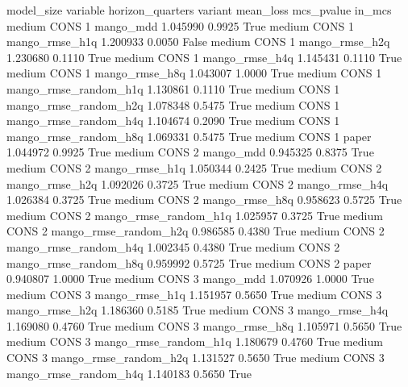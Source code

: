 model_size variable  horizon_quarters               variant  mean_loss  mcs_pvalue  in_mcs
    medium     CONS                 1             mango_mdd   1.045990      0.9925    True
    medium     CONS                 1        mango_rmse_h1q   1.200933      0.0050   False
    medium     CONS                 1        mango_rmse_h2q   1.230680      0.1110    True
    medium     CONS                 1        mango_rmse_h4q   1.145431      0.1110    True
    medium     CONS                 1        mango_rmse_h8q   1.043007      1.0000    True
    medium     CONS                 1 mango_rmse_random_h1q   1.130861      0.1110    True
    medium     CONS                 1 mango_rmse_random_h2q   1.078348      0.5475    True
    medium     CONS                 1 mango_rmse_random_h4q   1.104674      0.2090    True
    medium     CONS                 1 mango_rmse_random_h8q   1.069331      0.5475    True
    medium     CONS                 1                 paper   1.044972      0.9925    True
    medium     CONS                 2             mango_mdd   0.945325      0.8375    True
    medium     CONS                 2        mango_rmse_h1q   1.050344      0.2425    True
    medium     CONS                 2        mango_rmse_h2q   1.092026      0.3725    True
    medium     CONS                 2        mango_rmse_h4q   1.026384      0.3725    True
    medium     CONS                 2        mango_rmse_h8q   0.958623      0.5725    True
    medium     CONS                 2 mango_rmse_random_h1q   1.025957      0.3725    True
    medium     CONS                 2 mango_rmse_random_h2q   0.986585      0.4380    True
    medium     CONS                 2 mango_rmse_random_h4q   1.002345      0.4380    True
    medium     CONS                 2 mango_rmse_random_h8q   0.959992      0.5725    True
    medium     CONS                 2                 paper   0.940807      1.0000    True
    medium     CONS                 3             mango_mdd   1.070926      1.0000    True
    medium     CONS                 3        mango_rmse_h1q   1.151957      0.5650    True
    medium     CONS                 3        mango_rmse_h2q   1.186360      0.5185    True
    medium     CONS                 3        mango_rmse_h4q   1.169080      0.4760    True
    medium     CONS                 3        mango_rmse_h8q   1.105971      0.5650    True
    medium     CONS                 3 mango_rmse_random_h1q   1.180679      0.4760    True
    medium     CONS                 3 mango_rmse_random_h2q   1.131527      0.5650    True
    medium     CONS                 3 mango_rmse_random_h4q   1.140183      0.5650    True
